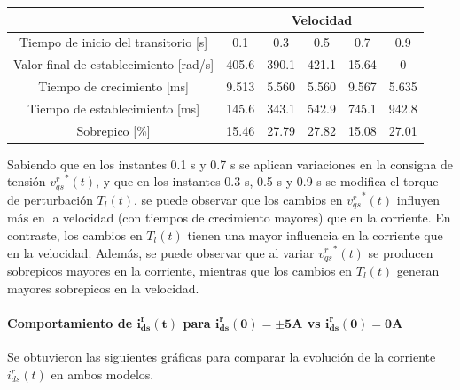 \documentclass[a4paper, 10pt, onecolumn,journal]{ieeeconf}
\begin{document}
\begin{table}[H]
	\centering
	\begin{tabular}{|c|ccccc|}
		\hline
		& \multicolumn{5}{c|}{Velocidad}                                                                                            \\ \hline
		Tiempo de inicio del transitorio {[}s{]}   & \multicolumn{1}{c|}{0.1}   & \multicolumn{1}{c|}{0.3}   & \multicolumn{1}{c|}{0.5}   & \multicolumn{1}{c|}{0.7}   & 0.9   \\ \hline
		Valor final de establecimiento {[}rad/s{]} & \multicolumn{1}{c|}{405.6} & \multicolumn{1}{c|}{390.1} & \multicolumn{1}{c|}{421.1} & \multicolumn{1}{c|}{15.64} & 0     \\ \hline
		Tiempo de crecimiento {[}ms{]}             & \multicolumn{1}{c|}{9.513} & \multicolumn{1}{c|}{5.560} & \multicolumn{1}{c|}{5.560} & \multicolumn{1}{c|}{9.567} & 5.635 \\ \hline
		Tiempo de establecimiento {[}ms{]}         & \multicolumn{1}{c|}{145.6} & \multicolumn{1}{c|}{343.1} & \multicolumn{1}{c|}{542.9} & \multicolumn{1}{c|}{745.1} & 942.8 \\ \hline
		Sobrepico {[}\%{]}                         & \multicolumn{1}{c|}{15.46} & \multicolumn{1}{c|}{27.79} & \multicolumn{1}{c|}{27.82} & \multicolumn{1}{c|}{15.08} & 27.01 \\ \hline
	\end{tabular}
\end{table}


Sabiendo que en los instantes 0.1 s y 0.7 s se aplican variaciones en la consigna de tensión ${v^r_{qs}}^*(t)$, y que en los instantes 0.3 s, 0.5 s y 0.9 s se modifica el torque de perturbación $T_l(t)$, se puede observar que los cambios en ${v^r_{qs}}^*(t)$ influyen más en la velocidad (con tiempos de crecimiento mayores) que en la corriente. En contraste, los cambios en $T_l(t)$ tienen una mayor influencia en la corriente que en la velocidad. Además, se puede observar que al variar ${v^r_{qs}}^*(t)$ se producen sobrepicos mayores en la corriente, mientras que los cambios en $T_l(t)$ generan mayores sobrepicos en la velocidad.

\paragraph{\textbf{Comportamiento de $\mathbf{i^r_{ds}(t)}$ para $\mathbf{i^r_{ds}(0) = \pm 5A}$ vs $\mathbf{i^r_{ds}(0) = 0A}$}} 
Se obtuvieron las siguientes gráficas para comparar la evolución de la corriente $i^r_{ds}(t)$ en ambos modelos.
\end{document}
